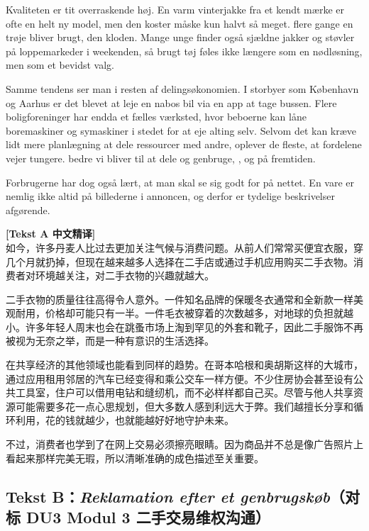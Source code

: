 Kvaliteten er tit overraskende høj. En varm vinterjakke fra et kendt mærke er ofte  en helt ny model, men den koster måske kun halvt så meget.  flere gange en trøje bliver brugt,  den kloden. Mange unge finder også sjældne jakker og støvler på loppemarkeder i weekenden, så brugt tøj føles ikke længere som en nødløsning, men som et bevidst valg.

Samme tendens ser man i resten af delingsøkonomien. I storbyer som København og Aarhus er det blevet  at leje en nabos bil via en app  at tage bussen. Flere boligforeninger har endda et fælles værksted, hvor beboerne kan låne boremaskiner og symaskiner i stedet for at eje alting selv. Selvom det kan kræve lidt mere planlægning at dele ressourcer med andre, oplever de fleste, at fordelene vejer tungere.  bedre vi bliver til at dele og genbruge, , og  på fremtiden.

Forbrugerne har dog også lært, at man skal se sig godt for på nettet. En vare er nemlig ikke altid  på billederne i annoncen, og derfor er tydelige beskrivelser afgørende.

\begin{transbox}
\small
\textbf{\color{NCDTeal}[Tekst A 中文精译]}\\
如今，许多丹麦人比过去更加关注气候与消费问题。从前人们常常买便宜衣服，穿几个月就扔掉，但现在越来越多人选择在二手店或通过手机应用购买二手衣物。消费者对环境越关注，对二手衣物的兴趣就越大。

二手衣物的质量往往高得令人意外。一件知名品牌的保暖冬衣通常和全新款一样美观耐用，价格却可能只有一半。一件毛衣被穿着的次数越多，对地球的负担就越小。许多年轻人周末也会在跳蚤市场上淘到罕见的外套和靴子，因此二手服饰不再被视为无奈之举，而是一种有意识的生活选择。

在共享经济的其他领域也能看到同样的趋势。在哥本哈根和奥胡斯这样的大城市，通过应用租用邻居的汽车已经变得和乘公交车一样方便。不少住房协会甚至设有公共工具室，住户可以借用电钻和缝纫机，而不必样样都自己买。尽管与他人共享资源可能需要多花一点心思规划，但大多数人感到利远大于弊。我们越擅长分享和循环利用，花的钱就越少，也就能越好好地守护未来。

不过，消费者也学到了在网上交易必须擦亮眼睛。因为商品并不总是像广告照片上看起来那样完美无瑕，所以清晰准确的成色描述至关重要。
\end{transbox}

\subsection*{Tekst B：\textit{Reklamation efter et genbrugskøb}（对标 DU3 Modul 3 二手交易维权沟通）}

